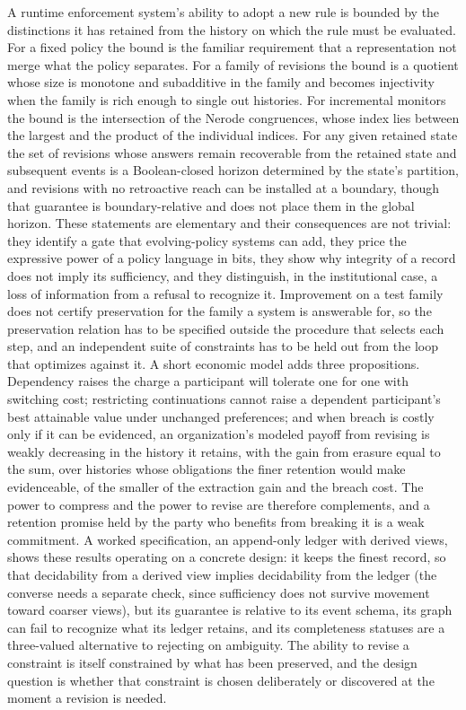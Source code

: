 \documentclass[11pt]{article}
\theoremstyle{definition}
\theoremstyle{remark}
\begin{document}
A runtime enforcement system's ability to adopt a new rule is bounded by the distinctions it has retained from the history on which the rule must be evaluated. For a fixed policy the bound is the familiar requirement that a representation not merge what the policy separates. For a family of revisions the bound is a quotient whose size is monotone and subadditive in the family and becomes injectivity when the family is rich enough to single out histories. For incremental monitors the bound is the intersection of the Nerode congruences, whose index lies between the largest and the product of the individual indices. For any given retained state the set of revisions whose answers remain recoverable from the retained state and subsequent events is a Boolean-closed horizon determined by the state's partition, and revisions with no retroactive reach can be installed at a boundary, though that guarantee is boundary-relative and does not place them in the global horizon. These statements are elementary and their consequences are not trivial: they identify a gate that evolving-policy systems can add, they price the expressive power of a policy language in bits, they show why integrity of a record does not imply its sufficiency, and they distinguish, in the institutional case, a loss of information from a refusal to recognize it. Improvement on a test family does not certify preservation for the family a system is answerable for, so the preservation relation has to be specified outside the procedure that selects each step, and an independent suite of constraints has to be held out from the loop that optimizes against it. A short economic model adds three propositions. Dependency raises the charge a participant will tolerate one for one with switching cost; restricting continuations cannot raise a dependent participant's best attainable value under unchanged preferences; and when breach is costly only if it can be evidenced, an organization's modeled payoff from revising is weakly decreasing in the history it retains, with the gain from erasure equal to the sum, over histories whose obligations the finer retention would make evidenceable, of the smaller of the extraction gain and the breach cost. The power to compress and the power to revise are therefore complements, and a retention promise held by the party who benefits from breaking it is a weak commitment. A worked specification, an append-only ledger with derived views, shows these results operating on a concrete design: it keeps the finest record, so that decidability from a derived view implies decidability from the ledger (the converse needs a separate check, since sufficiency does not survive movement toward coarser views), but its guarantee is relative to its event schema, its graph can fail to recognize what its ledger retains, and its completeness statuses are a three-valued alternative to rejecting on ambiguity. The ability to revise a constraint is itself constrained by what has been preserved, and the design question is whether that constraint is chosen deliberately or discovered at the moment a revision is needed.
\end{document}
